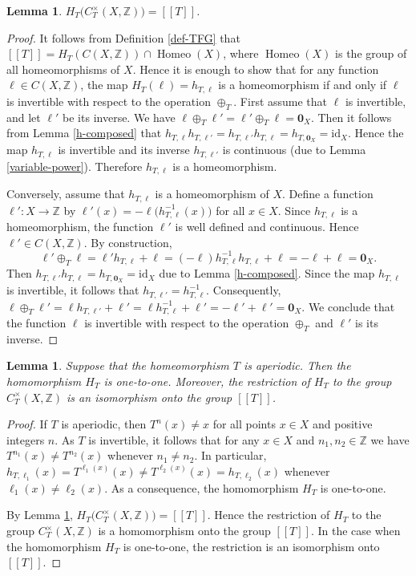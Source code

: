 \documentclass[12pt]{article}
\newtheorem{lemma}[theorem]{Lemma}
\theoremstyle{definition}
\def\bZ{\mathbb{Z}}
\def\Homeo{\mathop{\mathrm{Homeo}}}
\def\id{\mathrm{id}}
\def\0{\mathbf{0}}
\begin{document}
\begin{lemma}\label{image-of-group}
$H_T\bigl(C^\times_T(X,\bZ)\bigr)=[[T]]$.
\end{lemma}

\begin{proof}
It follows from Definition \ref{def-TFG} that 
$[[T]]=H_T(C(X,\bZ))\cap\Homeo(X)$, where $\Homeo(X)$ is the group of all 
homeomorphisms of $X$.  Hence it is enough to show that for any function 
$\ell\in C(X,\bZ)$, the map $H_T(\ell)=h_{T,\ell}$ is a homeomorphism if 
and only if $\ell$ is invertible with respect to the operation $\oplus_T$.  
First assume that $\ell$ is invertible, and let $\ell'$ be its inverse.  We 
have $\ell\oplus_T\ell'=\ell'\oplus_T\ell=\0_X$.  Then it follows from 
Lemma \ref{h-composed} that $h_{T,\ell}h_{T,\ell'}=h_{T,\ell'}h_{T,\ell} 
=h_{T,\0_X}=\id_X$.  Hence the map $h_{T,\ell}$ is invertible and its 
inverse $h_{T,\ell'}$ is continuous (due to Lemma \ref{variable-power}).  
Therefore $h_{T,\ell}$ is a homeomorphism.

Conversely, assume that $h_{T,\ell}$ is a homeomorphism of $X$.  Define a 
function $\ell':X\to\bZ$ by $\ell'(x)=-\ell\bigl(h_{T,\ell}^{-1}(x)\bigr)$ 
for all $x\in X$.  Since $h_{T,\ell}$ is a homeomorphism, the function 
$\ell'$ is well defined and continuous.  Hence $\ell'\in C(X,\bZ)$.  By 
construction,
\[
\ell'\oplus_T\ell=\ell'h_{T,\ell}+\ell=
(-\ell)h_{T,\ell}^{-1}h_{T,\ell}+\ell= -\ell+\ell=\0_X.
\]
Then $h_{T,\ell'}h_{T,\ell}=h_{T,\0_X}=\id_X$ due to Lemma 
\ref{h-composed}.  Since the map $h_{T,\ell}$ is invertible, it follows 
that $h_{T,\ell'}=h_{T,\ell}^{-1}$.  Consequently, $\ell\oplus_T\ell'=\ell 
h_{T,\ell'}+\ell'=\ell h_{T,\ell}^{-1}+\ell'=-\ell'+\ell'=\0_X$.  We 
conclude that the function $\ell$ is invertible with respect to the 
operation $\oplus_T$ and $\ell'$ is its inverse.
\end{proof}

\begin{lemma}\label{model-isomorphism}
Suppose that the homeomorphism $T$ is aperiodic.  Then the homomorphism 
$H_T$ is one-to-one.  Moreover, the restriction of $H_T$ to the group 
$C^\times_T(X,\bZ)$ is an isomorphism onto the group $[[T]]$.
\end{lemma}

\begin{proof}
If $T$ is aperiodic, then $T^n(x)\ne x$ for all points $x\in X$ and 
positive integers $n$.  As $T$ is invertible, it follows that for any $x\in 
X$ and $n_1,n_2\in\bZ$ we have $T^{n_1}(x)\ne T^{n_2}(x)$ whenever $n_1\ne 
n_2$.  In particular, $h_{T,\ell_1}(x)=T^{\ell_1(x)}(x)\ne 
T^{\ell_2(x)}(x)=h_{T,\ell_2}(x)$ whenever $\ell_1(x)\ne\ell_2(x)$.  As a 
consequence, the homomorphism $H_T$ is one-to-one.

By Lemma \ref{image-of-group}, $H_T\bigl(C^\times_T(X,\bZ)\bigr)=[[T]]$.  
Hence the restriction of $H_T$ to the group $C^\times_T(X,\bZ)$ is a 
homomorphism onto the group $[[T]]$.  In the case when the homomorphism 
$H_T$ is one-to-one, the restriction is an isomorphism onto $[[T]]$.
\end{proof}
\end{document}
